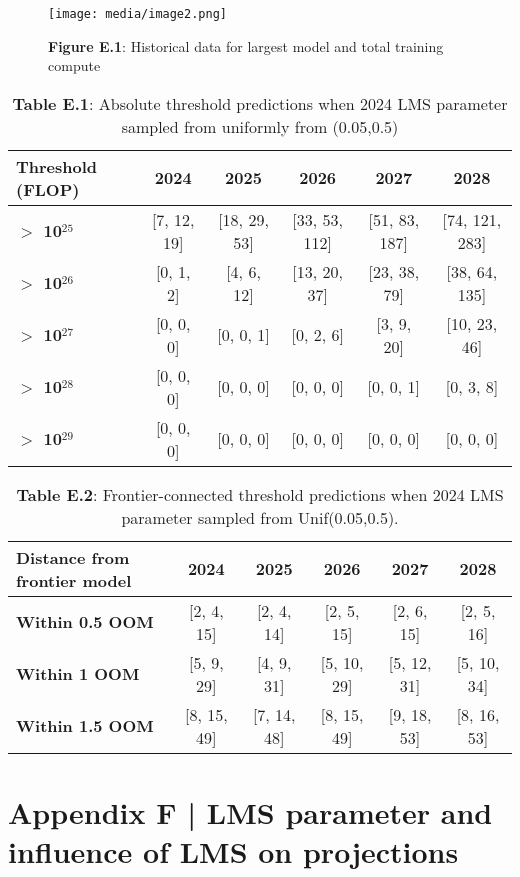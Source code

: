 \documentclass[11pt]{article}
\begin{document}
\begin{figure}[h]
\centering
\texttt{[image: media/image2.png]}
\caption*{\textbf{Figure E.1}: Historical data for largest model and total training compute}
\end{figure}

\begin{table}[h]
\centering
\caption*{\textbf{Table E.1}: Absolute threshold predictions when 2024 LMS parameter sampled from uniformly from (0.05,0.5)}
\begin{tabular}{|l|c|c|c|c|c|}
\hline
\textbf{Threshold (FLOP)} & \textbf{2024} & \textbf{2025} & \textbf{2026} & \textbf{2027} & \textbf{2028} \\
\hline
\textbf{$>$ 10$^{25}$} & [7, 12, 19] & [18, 29, 53] & [33, 53, 112] & [51, 83, 187] & [74, 121, 283] \\
\hline
\textbf{$>$ 10$^{26}$} & [0, 1, 2] & [4, 6, 12] & [13, 20, 37] & [23, 38, 79] & [38, 64, 135] \\
\hline
\textbf{$>$ 10$^{27}$} & [0, 0, 0] & [0, 0, 1] & [0, 2, 6] & [3, 9, 20] & [10, 23, 46] \\
\hline
\textbf{$>$ 10$^{28}$} & [0, 0, 0] & [0, 0, 0] & [0, 0, 0] & [0, 0, 1] & [0, 3, 8] \\
\hline
\textbf{$>$ 10$^{29}$} & [0, 0, 0] & [0, 0, 0] & [0, 0, 0] & [0, 0, 0] & [0, 0, 0] \\
\hline
\end{tabular}
\end{table}

\begin{table}[h]
\centering
\caption*{\textbf{Table E.2}: Frontier-connected threshold predictions when 2024 LMS parameter sampled from Unif(0.05,0.5).}
\begin{tabular}{|l|c|c|c|c|c|}
\hline
\textbf{Distance from frontier model} & \textbf{2024} & \textbf{2025} & \textbf{2026} & \textbf{2027} & \textbf{2028} \\
\hline
\textbf{Within 0.5 OOM} & [2, 4, 15] & [2, 4, 14] & [2, 5, 15] & [2, 6, 15] & [2, 5, 16] \\
\hline
\textbf{Within 1 OOM} & [5, 9, 29] & [4, 9, 31] & [5, 10, 29] & [5, 12, 31] & [5, 10, 34] \\
\hline
\textbf{Within 1.5 OOM} & [8, 15, 49] & [7, 14, 48] & [8, 15, 49] & [9, 18, 53] & [8, 16, 53] \\
\hline
\end{tabular}
\end{table}

\section{Appendix F | LMS parameter and influence of LMS on projections}
\end{document}
